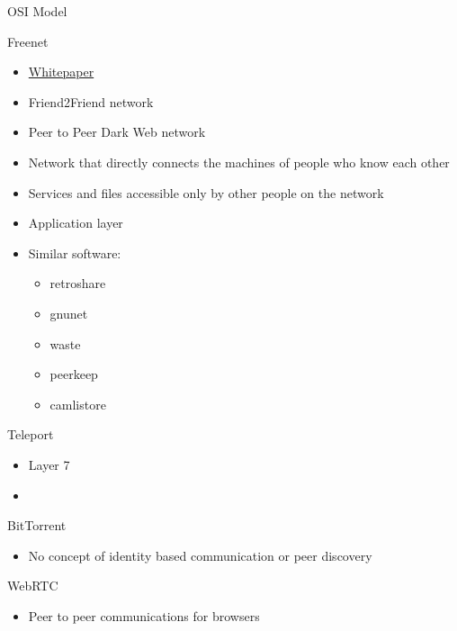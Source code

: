 \begin{frame}[fragile]{OSI Model}
\begin{block}{Freenet}
\protect\hypertarget{freenet}{}
\begin{itemize}
\tightlist
\item
  \href{https://homepage.divms.uiowa.edu/~ghosh/freenet.pdf}{Whitepaper}
\item
  Friend2Friend network
\item
  Peer to Peer Dark Web network
\item
  Network that directly connects the machines of people who know each
  other
\item
  Services and files accessible only by other people on the network
\item
  Application layer
\item
  Similar software:

  \begin{itemize}
  \tightlist
  \item
    retroshare
  \item
    gnunet
  \item
    waste
  \item
    peerkeep
  \item
    camlistore
  \end{itemize}
\end{itemize}
\end{block}

\begin{block}{Teleport}
\protect\hypertarget{teleport}{}
\begin{itemize}
\tightlist
\item
  Layer 7
\item
\end{itemize}
\end{block}

\begin{block}{BitTorrent}
\protect\hypertarget{bittorrent}{}
\begin{itemize}
\tightlist
\item
  No concept of identity based communication or peer discovery
\end{itemize}
\end{block}

\begin{block}{WebRTC}
\protect\hypertarget{webrtc}{}
\begin{itemize}
\tightlist
\item
  Peer to peer communications for browsers


\end{itemize}
\end{block}
\end{frame}
